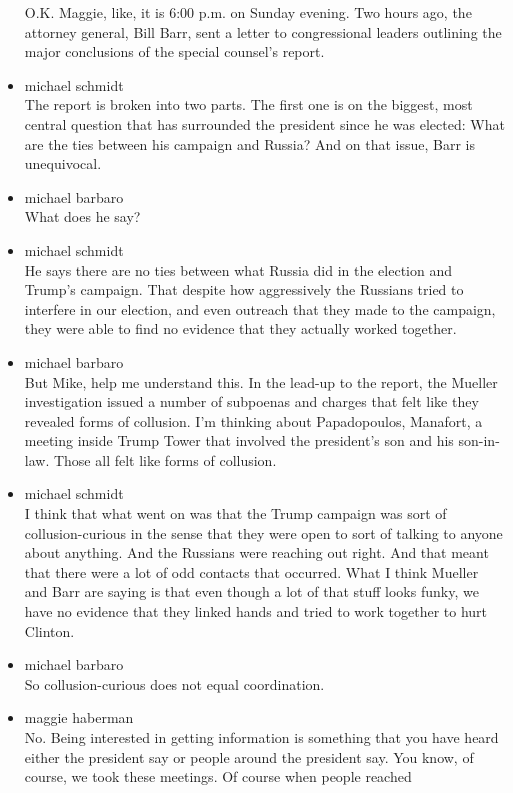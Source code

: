 \begin{itemize}
  O.K. Maggie, like, it is 6:00 p.m. on Sunday evening. Two hours ago,
  the attorney general, Bill Barr, sent a letter to congressional
  leaders outlining the major conclusions of the special counsel's
  report.
\item
  michael schmidt\\
  The report is broken into two parts. The first one is on the biggest,
  most central question that has surrounded the president since he was
  elected: What are the ties between his campaign and Russia? And on
  that issue, Barr is unequivocal.
\item
  michael barbaro\\
  What does he say?
\item
  michael schmidt\\
  He says there are no ties between what Russia did in the election and
  Trump's campaign. That despite how aggressively the Russians tried to
  interfere in our election, and even outreach that they made to the
  campaign, they were able to find no evidence that they actually worked
  together.
\item
  michael barbaro\\
  But Mike, help me understand this. In the lead-up to the report, the
  Mueller investigation issued a number of subpoenas and charges that
  felt like they revealed forms of collusion. I'm thinking about
  Papadopoulos, Manafort, a meeting inside Trump Tower that involved the
  president's son and his son-in-law. Those all felt like forms of
  collusion.
\item
  michael schmidt\\
  I think that what went on was that the Trump campaign was sort of
  collusion-curious in the sense that they were open to sort of talking
  to anyone about anything. And the Russians were reaching out right.
  And that meant that there were a lot of odd contacts that occurred.
  What I think Mueller and Barr are saying is that even though a lot of
  that stuff looks funky, we have no evidence that they linked hands and
  tried to work together to hurt Clinton.
\item
  michael barbaro\\
  So collusion-curious does not equal coordination.
\item
  maggie haberman\\
  No. Being interested in getting information is something that you have
  heard either the president say or people around the president say. You
  know, of course, we took these meetings. Of course when people reached

\end{itemize}
